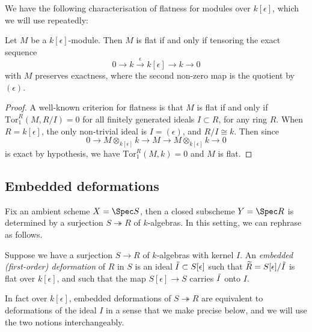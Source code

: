 We have the following characterisation of flatness for modules over
$k[\epsilon]$, which we will use repeatedly:
\begin{lemma} 
    \label{flatness} 
    Let $M$ be a $k[\epsilon]$-module. Then $M$ is flat if and only if tensoring
    the exact sequence 
    \[0\rightarrow k \xrightarrow{\;\epsilon\;} k[\epsilon] \longrightarrow k
    \rightarrow 0\]
    with \(M\) preserves exactness, where the second non-zero map is the
    quotient by $(\epsilon)$.  
    \begin{proof} 
        A well-known criterion for flatness \cite[see for example][proposition
        6.1]{eisen} is that $M$ is flat if and only if $\text{Tor}_1^R(M,R/I)=0$
        for all finitely generated ideals $I\subset R$, for any ring $R$. When
        $R=k[\epsilon]$, the only non-trivial ideal is $I=(\epsilon)$, and
        $R/I\cong k$. Then since 
        \[0 \to M\otimes_{k[\epsilon]}k\to M\to
        M\otimes_{k[\epsilon]}k\to0 \] 
        is exact by hypothesis, we have $\text{Tor}_1^R(M,k)=0$ and $M$ is flat.  
    \end{proof}
\end{lemma}

\subsection{Embedded deformations}
Fix an ambient scheme \(X=\Spec S\), then a closed subscheme \(Y=\Spec R\) is
determined by a surjection \(S\twoheadrightarrow R\) of \(k\)-algebras. In this
setting, we can rephrase  as follows.

\begin{definition} 
    Suppose we have a surjection $S\to R$ of $k$-algebras with kernel $I$. An
    \textit{embedded (first-order) deformation} of $R$ in $S$ is an ideal
    $\tilde{I}\subset S[\epsilon]$ such that $\widetilde{R}=S[\epsilon]/\tilde{I}$ is flat over
    $k[\epsilon]$, and such that the map $S[\epsilon]\to S$ carries $\tilde{I}$ onto
    $I$. 
\end{definition}

In fact over \(k[\epsilon]\), embedded deformations of \(S\twoheadrightarrow R\)
are equivalent to deformations of the ideal \(I\) in a sense that we make
precise below, and we will use the two notions interchangeably. 

